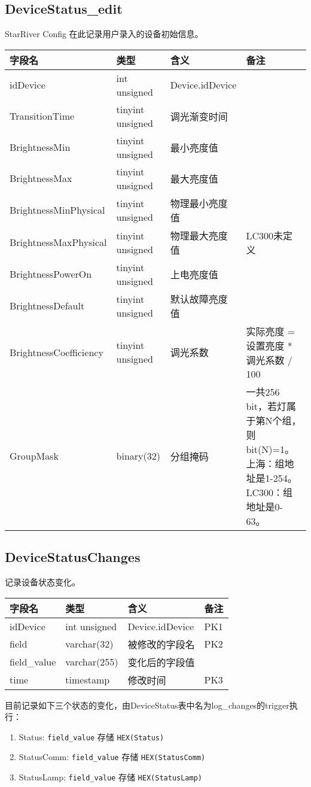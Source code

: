 \subsection{DeviceStatus\_edit}\label{devicestatusux5fedit}

StarRiver Config 在此记录用户录入的设备初始信息。

\begin{longtabu}[c]{@{}lXXX@{}}
\toprule
字段名 & 类型 & 含义 & 备注\tabularnewline
\midrule
\endhead
idDevice & int unsigned & Device.idDevice &\tabularnewline
TransitionTime & tinyint unsigned & 调光渐变时间 &\tabularnewline
BrightnessMin & tinyint unsigned & 最小亮度值 &\tabularnewline
BrightnessMax & tinyint unsigned & 最大亮度值 &\tabularnewline
BrightnessMinPhysical & tinyint unsigned & 物理最小亮度值
&\tabularnewline
BrightnessMaxPhysical & tinyint unsigned & 物理最大亮度值 &
LC300未定义\tabularnewline
BrightnessPowerOn & tinyint unsigned & 上电亮度值 &\tabularnewline
BrightnessDefault & tinyint unsigned & 默认故障亮度值 &\tabularnewline
BrightnessCoefficiency & tinyint unsigned & 调光系数 & 实际亮度 =
设置亮度 * 调光系数 / 100\tabularnewline
GroupMask & binary(32) & 分组掩码 & 一共256
bit，若灯属于第N个组，则bit(N)=1。上海：组地址是1-254。LC300：组地址是0-63。\tabularnewline
\bottomrule
\end{longtabu}

\subsection{DeviceStatusChanges}\label{devicestatuschanges}

记录设备状态变化。

\begin{longtabu}[c]{@{}lXXX@{}}
\toprule
字段名 & 类型 & 含义 & 备注\tabularnewline
\midrule
\endhead
idDevice & int unsigned & Device.idDevice & PK1\tabularnewline
field & varchar(32) & 被修改的字段名 & PK2\tabularnewline
field\_value & varchar(255) & 变化后的字段值 &\tabularnewline
time & timestamp & 修改时间 & PK3\tabularnewline
\bottomrule
\end{longtabu}

目前记录如下三个状态的变化，由DeviceStatus表中名为log\_changes的trigger执行：

\begin{enumerate}
\def\labelenumi{\arabic{enumi}.}
\itemsep1pt\parskip0pt
\item
  Status: \texttt{field\_value} 存储 \texttt{HEX(Status)}
\item
  StatusComm: \texttt{field\_value} 存储 \texttt{HEX(StatusComm)}
\item
  StatusLamp: \texttt{field\_value} 存储 \texttt{HEX(StatusLamp)}
\end{enumerate}


